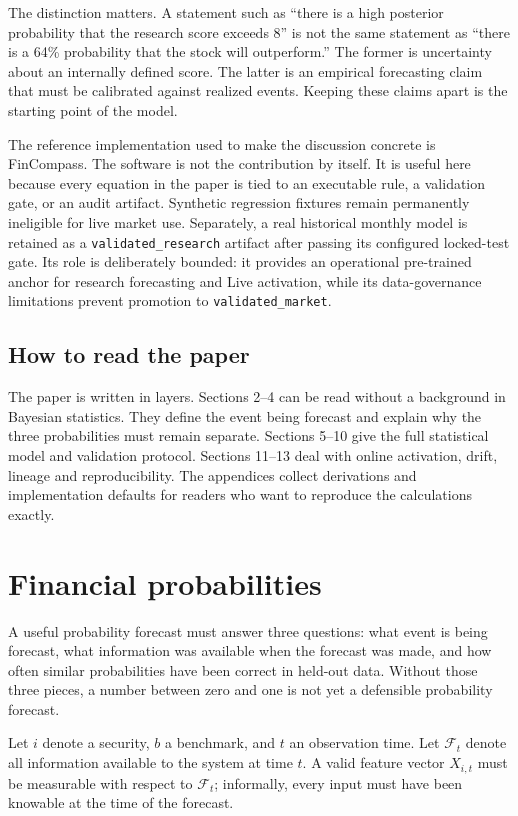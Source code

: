 \documentclass[11pt]{article}
\newcommand{\calF}{\mathcal{F}}
\begin{document}
The distinction matters. A statement such as ``there is a high posterior probability that the research score exceeds 8'' is not the same statement as ``there is a 64\% probability that the stock will outperform.'' The former is uncertainty about an internally defined score. The latter is an empirical forecasting claim that must be calibrated against realized events. Keeping these claims apart is the starting point of the model.

The reference implementation used to make the discussion concrete is FinCompass. The software is not the contribution by itself. It is useful here because every equation in the paper is tied to an executable rule, a validation gate, or an audit artifact. Synthetic regression fixtures remain permanently ineligible for live market use. Separately, a real historical monthly model is retained as a \texttt{validated\_research} artifact after passing its configured locked-test gate. Its role is deliberately bounded: it provides an operational pre-trained anchor for research forecasting and Live activation, while its data-governance limitations prevent promotion to \texttt{validated\_market}.

\subsection{How to read the paper}

The paper is written in layers. Sections 2--4 can be read without a background in Bayesian statistics. They define the event being forecast and explain why the three probabilities must remain separate. Sections 5--10 give the full statistical model and validation protocol. Sections 11--13 deal with online activation, drift, lineage and reproducibility. The appendices collect derivations and implementation defaults for readers who want to reproduce the calculations exactly.

\section{Financial probabilities}
\label{sec:meaning}

A useful probability forecast must answer three questions: what event is being forecast, what information was available when the forecast was made, and how often similar probabilities have been correct in held-out data. Without those three pieces, a number between zero and one is not yet a defensible probability forecast.

Let $i$ denote a security, $b$ a benchmark, and $t$ an observation time. Let $\calF_t$ denote all information available to the system at time $t$. A valid feature vector $X_{i,t}$ must be measurable with respect to $\calF_t$; informally, every input must have been knowable at the time of the forecast.
\end{document}
